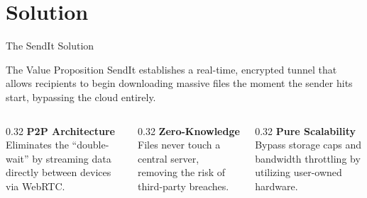 \documentclass[aspectratio=169]{beamer}
\begin{document}
\section{Solution}
\begin{frame}{The SendIt Solution}
    \begin{block}{The Value Proposition}
        SendIt establishes a real-time, encrypted tunnel that allows recipients to begin downloading massive files the moment the sender hits start, bypassing the cloud entirely.
    \end{block}

    \vspace{0.3cm}
    \begin{columns}[t]
        \begin{column}{0.32\textwidth}
            \small \textbf{P2P Architecture}\\
            Eliminates the ``double-wait'' by streaming data directly between devices via WebRTC.
        \end{column}
        \begin{column}{0.32\textwidth}
            \small \textbf{Zero-Knowledge}\\
            Files never touch a central server, removing the risk of third-party breaches.
        \end{column}
        \begin{column}{0.32\textwidth}
            \small \textbf{Pure Scalability}\\
            Bypass storage caps and bandwidth throttling by utilizing user-owned hardware.
        \end{column}
    \end{columns}
\end{frame}

\end{document}
